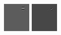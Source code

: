 \begin{figure}[ht]
 \includegraphics[width=\textwidth*11/100]{ch5/figures/firstgabor_C5.jpg}
 \includegraphics[width=\textwidth*11/100]{ch5/figures/firstgabor_C6.jpg}

\end{figure}
